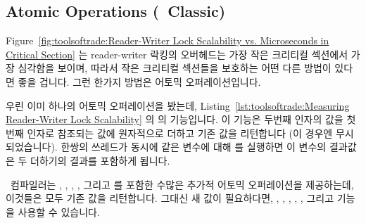 \fi

\subsection{Atomic Operations (\GCC\ Classic)}
\label{sec:toolsoftrade:Atomic Operations (gcc Classic)}

Figure~\ref{fig:toolsoftrade:Reader-Writer Lock Scalability vs. Microseconds in Critical Section}
는 reader-writer 락킹의 오버헤드는 가장 작은 크리티컬 섹션에서 가장 심각함을
보이며, 따라서 작은 크리티컬 섹션들을 보호하는 어떤 다른 방법이 있다면 좋을
겁니다.
그런 한가지 방법은 어토믹 오퍼레이션입니다.
\begin{fcvref}
우린 이미 하나의 어토믹 오퍼레이션을 봤는데,
Listing~\ref{lst:toolsoftrade:Measuring Reader-Writer Lock Scalability}
의  의  기능입니다.
이 기능은 두번째 인자의 값을 첫번째 인자로 참조되는 값에 원자적으로 더하고 기존
값을 리턴합니다 (이 경우엔 무시되었습니다).
한쌍의 쓰레드가 동시에 같은 변수에 대해  를 실행하면
이 변수의 결과값은 두 더하기의 결과를 포함하게 됩니다.
\end{fcvref}

\GNUC\ 컴파일러는
 ,
,
,
, 그리고
를 포함한 수많은 추가적 어토믹 오퍼레이션을 제공하는데, 이것들은 모두 기존 값을
리턴합니다.
그대신 새 값이 필요하다면,
,
,
,
,
, 그리고
기능을 사용할 수 있습니다.

